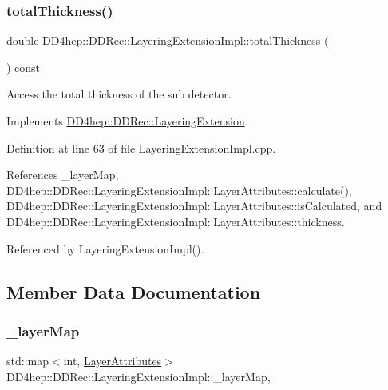 \subsubsection{\texorpdfstring{total\+Thickness()}{totalThickness()}}
{\footnotesize\ttfamily double D\+D4hep\+::\+D\+D\+Rec\+::\+Layering\+Extension\+Impl\+::total\+Thickness (\begin{DoxyParamCaption}{ }\end{DoxyParamCaption}) const\hspace{0.3cm}{\ttfamily [virtual]}}



Access the total thickness of the sub detector. 



Implements \hyperlink{class_d_d4hep_1_1_d_d_rec_1_1_layering_extension_a287dd58b108f5d121bc55c91009454ed}{D\+D4hep\+::\+D\+D\+Rec\+::\+Layering\+Extension}.



Definition at line 63 of file Layering\+Extension\+Impl.\+cpp.



References \+\_\+layer\+Map, D\+D4hep\+::\+D\+D\+Rec\+::\+Layering\+Extension\+Impl\+::\+Layer\+Attributes\+::calculate(), D\+D4hep\+::\+D\+D\+Rec\+::\+Layering\+Extension\+Impl\+::\+Layer\+Attributes\+::is\+Calculated, and D\+D4hep\+::\+D\+D\+Rec\+::\+Layering\+Extension\+Impl\+::\+Layer\+Attributes\+::thickness.



Referenced by Layering\+Extension\+Impl().



\subsection{Member Data Documentation}
\hypertarget{class_d_d4hep_1_1_d_d_rec_1_1_layering_extension_impl_a59400bb78b40886a131cb8b085df125b}{}\label{class_d_d4hep_1_1_d_d_rec_1_1_layering_extension_impl_a59400bb78b40886a131cb8b085df125b} 
\subsubsection{\texorpdfstring{\+\_\+layer\+Map}{\_layerMap}}
{\footnotesize\ttfamily std\+::map$<$int, \hyperlink{struct_d_d4hep_1_1_d_d_rec_1_1_layering_extension_impl_1_1_layer_attributes}{Layer\+Attributes}$>$ D\+D4hep\+::\+D\+D\+Rec\+::\+Layering\+Extension\+Impl\+::\+\_\+layer\+Map\hspace{0.3cm}{\ttfamily [mutable]}, {\ttfamily [protected]}}



